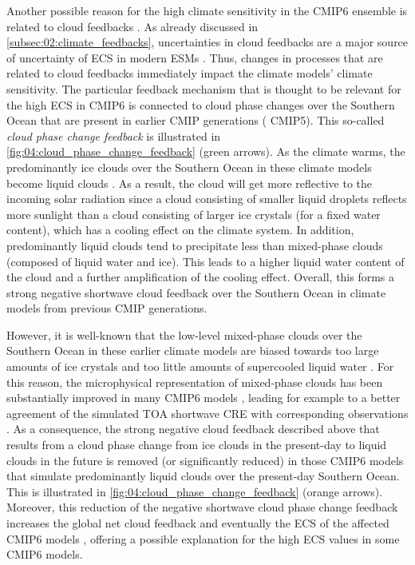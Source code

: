 Another possible reason for the high climate sensitivity in the \acs{CMIP}6
ensemble is related to cloud feedbacks \autocite{Bock2020}. As already
discussed in \cref{subsec:02:climate_feedbacks}, uncertainties in cloud
feedbacks are a major source of uncertainty of \ac{ECS} in modern \acp{ESM}
\autocite{Boucher2013, Flato2013}. Thus, changes in processes that are related
to cloud feedbacks immediately impact the climate models' climate sensitivity.
The particular feedback mechanism that is thought to be relevant for the high
\ac{ECS} in \acs{CMIP}6 is connected to cloud phase changes over the Southern
Ocean that are present in earlier \ac{CMIP} generations (\eg{} \acs{CMIP}5).
This so-called \emph{cloud phase change feedback} is illustrated in
\cref{fig:04:cloud_phase_change_feedback} (green arrows). As the climate warms,
the predominantly ice clouds over the Southern Ocean in these climate models
become liquid clouds \autocite{McCoy2015}. As a result, the cloud will get more
reflective to the incoming solar radiation since a cloud consisting of smaller
liquid droplets reflects more sunlight than a cloud consisting of larger ice
crystals (for a fixed water content), which has a cooling effect on the climate
system. In addition, predominantly liquid clouds tend to precipitate less than
mixed-phase clouds (composed of liquid water and ice). This leads to a higher
liquid water content of the cloud and a further amplification of the cooling
effect. Overall, this forms a strong negative shortwave cloud feedback over the
Southern Ocean in climate models from previous \ac{CMIP} generations.

However, it is well-known that the low-level mixed-phase clouds over the
Southern Ocean in these earlier climate models are biased towards too large
amounts of ice crystals and too little amounts of supercooled liquid water
\autocite{BodasSalcedo2016, McCoy2015, McCoy2016, Tan2016}. For this reason,
the microphysical representation of mixed-phase clouds has been substantially
improved in many \acs{CMIP}6 models \autocite{BodasSalcedo2019, Gettelman2019,
  Mulcahy2020, Williams2020}, leading for example to a better agreement of the
simulated \ac{TOA} shortwave \ac{CRE} with corresponding observations
\autocite{Bock2020}. As a consequence, the strong negative cloud feedback
described above that results from a cloud phase change from ice clouds in the
present-day to liquid clouds in the future is removed (or significantly
reduced) in those \acs{CMIP}6 models that simulate predominantly liquid clouds
over the present-day Southern Ocean. This is illustrated in
\cref{fig:04:cloud_phase_change_feedback} (orange arrows). Moreover, this
reduction of the negative shortwave cloud phase change feedback increases the
global net cloud feedback \autocite{BodasSalcedo2019, Tan2016} and eventually
the \ac{ECS} of the affected \acs{CMIP}6 models \autocite{Andrews2019,
  Gettelman2019}, offering a possible explanation for the high \ac{ECS} values
in some \acs{CMIP}6 models.

